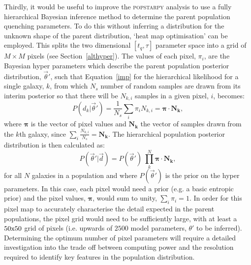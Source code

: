 Thirdly, it would be useful to improve the \textsc{popstarpy} analysis to use a fully hierarchical Bayesian inference method to determine the parent population quenching parameters. To do this without inferring a distribution for the unknown shape of the parent distribution, `heat map optimisation' can be employed. This splits the two dimensional $[t_q, \tau]$ parameter space into a grid of $M \times M$ pixels (see Section~\ref{althyper}). The values of each pixel, $\pi_i$, are the Bayesian hyper parameters which describe the parent population posterior distribution, $\vec{\theta}'$, such that Equation~\ref{imp} for the hierarchical likelihood for a single galaxy, $k$, from which $N_s$ number of random samples are drawn from its interim posterior so that there will be $N_{k,i}$ samples in a given pixel, $i$, becomes:
\begin{equation}\label{eq:heatmap}
P(d_k|\vec{\theta}')  = \frac{1}{N_s} \sum_i \pi_i N_{k,i} = \boldsymbol{\pi} \cdot \boldsymbol{N_k},
\end{equation}
where $\boldsymbol{\pi}$ is the vector of pixel values and $\boldsymbol{N_k}$ the vector of samples drawn from the $k$th galaxy, since $\sum_i \frac{N_{k,i}}{N_s} = \boldsymbol{N_k}$. The hierarchical population posterior distribution is then calculated as:
\begin{equation}\label{eq:parentdist}
P(\vec{\theta}'|\vec{d}) = P(\vec{\theta}')~\prod_k^N \boldsymbol{\pi} \cdot \boldsymbol{N_k},
\end{equation}
for all $N$ galaxies in a population and where $P(\vec{\theta}')$ is the prior on the hyper parameters. In this case, each pixel would need a prior (e.g. a basic entropic prior) and the pixel values, $\boldsymbol{\pi}$, would sum to unity, $\sum_i \pi_i = 1$. In order for this pixel map to accurately characterise the detail expected in the parent populations, the pixel grid would need to be sufficiently large, with at least a $50\rm{x}50$ grid of pixels (i.e. upwards of $2500$ model parameters, $\theta'$ to be inferred). Determining the optimum number of pixel parameters will require a detailed investigation into the trade off between computing power and the resolution required to identify key features in the population distribution. 

